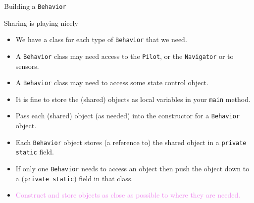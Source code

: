 \documentclass[color=pdftex,usenames,dvipsnames, aspectratio=169]{beamer}
\begin{document}
\begin{frame}{Building a \lstinline!Behavior!}
\begin{block}{Sharing is playing nicely}
\begin{itemize}
\item We have a \alert{class} for each type of \lstinline!Behavior! that we need.
\item A \lstinline!Behavior! class may need access to the \lstinline!Pilot!, or the \lstinline!Navigator! or to \alert{sensors}.
\item A \lstinline!Behavior! class may need to access some \alert{state control object}.
\item It is fine to store the (shared) objects as local variables in your \lstinline!main! method.
\item Pass each (shared) object (as needed) into the constructor for a \lstinline!Behavior! object.
\item Each \lstinline!Behavior! object stores (a reference to) the shared object in a \lstinline!private static! field.
\item If only one \lstinline!Behavior! needs to access an object then push the object down to a (\lstinline!private static!) field in that class.
\item \textcolor{violet}{Construct and store objects as close  as possible to where they are needed.}
\end{itemize}
\end{block}
\end{frame}
\end{document}
